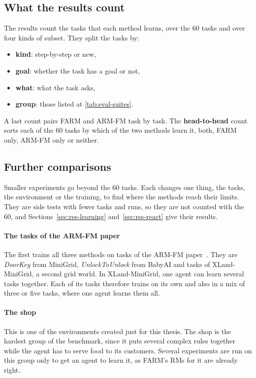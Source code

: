 \documentclass[11pt,english,listoffigures,listoftables]{tfgetsinf}
\newcommand{\env}[1]{\textsf{\slshape #1}}  %
\begin{document}
\subsection{What the results count}
The results count the tasks that each method learns, over the 60 tasks and over four kinds of subset. They split the tasks by:
\begin{itemize}
    \item \textbf{kind}: step-by-step or new, 
    \item \textbf{goal}: whether the task has a goal or not, 
    \item \textbf{what}: what the task asks, 
    \item \textbf{group}: those listed at \ref{tab:eval-suites}.
\end{itemize} 
A last count pairs FARM and ARM-FM task by task. The \textbf{head-to-head} count sorts each of the 60 tasks by which of the two methods learn it, both, FARM only, ARM-FM only or neither.

\subsection{Further comparisons}
\label{sec:eval-armfm-paper}Smaller experiments go beyond the 60 tasks. Each changes one thing, the tasks, the environment or the training, to find where the methods reach their limits. They are side tests with fewer tasks and runs, so they are not counted with the 60, and Sections~\ref{sec:res-learning} and~\ref{sec:res-react} give their results.

\paragraph{The tasks of the ARM-FM paper} The first trains all three methods on tasks of the ARM-FM paper~\cite{creus2026armfm}. They are \env{DoorKey} from MiniGrid, \env{UnlockToUnlock} from BabyAI and tasks of XLand-MiniGrid, a second grid world. In XLand-MiniGrid, one agent can learn several tasks together. Each of its tasks therefore trains on its own and also in a mix of three or five tasks, where one agent learns them all.

\paragraph{The shop} This is one of the environments created just for this thesis. The shop is the hardest group of the benchmark, since it puts several complex rules together while the agent has to serve food to its customers. Several experiments are run on this group only to get an agent to learn it, as FARM's RMs for it are already right.
\end{document}
